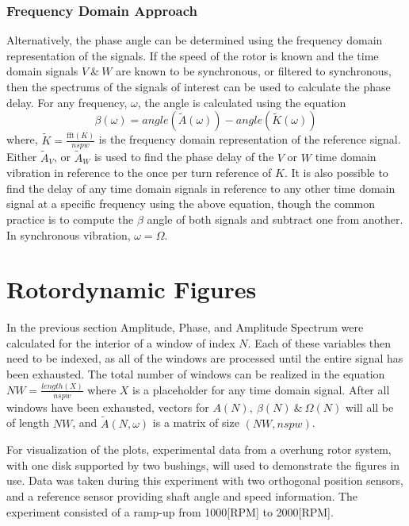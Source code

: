 \subsubsection{Frequency Domain Approach}
Alternatively, the phase angle can be determined using the frequency domain representation of the signals. 
If the speed of the rotor is known and the time domain signals $ V\ \&\ W $ are known to be synchronous, or filtered to synchronous, then the spectrums of the signals of interest can be used to calculate the phase delay. For any frequency, $ \omega $, the angle is calculated using the equation
\begin{equation*}
\beta(\omega)=angle(\tilde{A}(\omega))-angle(\tilde{K}(\omega))
\end{equation*}
where, $ \tilde{K} = \frac{\text{fft}(K)}{nspw} $ is the frequency domain representation of the reference signal. Either $ \tilde{A}_V $, or $ \tilde{A}_W $ is used to find the phase delay of the $ V $ or $ W $ time domain vibration in reference to the once per turn reference of $ K $. It is also possible to find the delay of any time domain signals in reference to any other time domain signal at a specific frequency using the above equation, though the common practice is to compute the $ \beta $ angle of both signals and subtract one from another. In synchronous vibration, $ \omega=\Omega $.\par
\section{Rotordynamic Figures}\label{ExperimentalPlots}
In the previous section Amplitude, Phase, and Amplitude Spectrum were calculated for the interior of a window of index $ N $. Each of these variables then need to be indexed, as all of the windows are processed until the entire signal has been exhausted. The total number of windows can be realized in the equation $ NW=\frac{length(X)}{nspw} $ where $ X $ is a placeholder for any time domain signal. After all windows have been exhausted, vectors for $ A(N),\ \beta(N)\ \&\ \Omega(N) $ will all be of length $ NW $, and $ \tilde{A}(N,\omega) $ is a matrix of size $ (NW,nspw) $.\par 
For visualization of the plots, experimental data from a overhung rotor system, with one disk supported by two bushings, will used to demonstrate the figures in use. Data was taken during this experiment with two orthogonal position sensors, and a reference sensor providing shaft angle and speed information. The experiment consisted of a ramp-up from 1000[RPM] to 2000[RPM].\par
